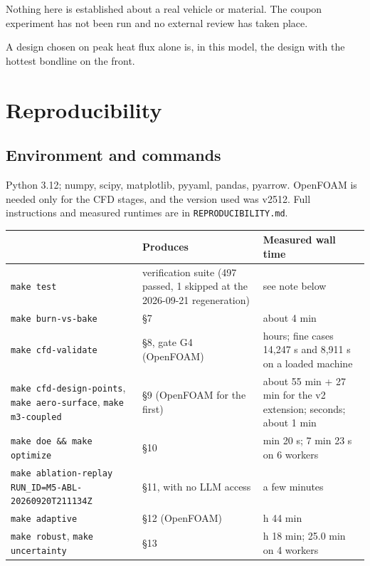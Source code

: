 \documentclass[
  a4paper,
  11pt]{article}
\newcommand{\tabhead}[1]{{\sffamily\bfseries\fontsize{8.5}{10.5}\selectfont #1}}
\begin{document}
Nothing here is established about a real vehicle or material. The coupon
experiment has not been run and no external review has taken place.

A design chosen on peak heat flux alone is, in this model, the design
with the hottest bondline on the front.

\section{Reproducibility}

\subsection{Environment and commands}

Python 3.12; numpy, scipy, matplotlib, pyyaml, pandas, pyarrow. OpenFOAM
is needed only for the CFD stages, and the version used was v2512. Full
instructions and measured runtimes are in \texttt{REPRODUCIBILITY.md}.

\begin{center}
\small\centering
\begin{tabular}{@{}>{\raggedright\arraybackslash}p{}>{\raggedright\arraybackslash}p{}>{\raggedright\arraybackslash}p{}@{}}
\toprule
\tabhead{Command} & \tabhead{Produces} & \tabhead{Measured wall time} \\
\midrule
\texttt{make test} & verification suite (497 passed, 1 skipped at the 2026-09-21
regeneration) & see note below \\
\texttt{make burn-\allowbreak{}vs-\allowbreak{}bake} & §7 & about 4 min \\
\texttt{make cfd-\allowbreak{}validate} & §8, gate G4 (OpenFOAM) & hours; fine cases 14,247 s and 8,911 s on a loaded machine \\
\texttt{make cfd-\allowbreak{}design-\allowbreak{}points},
\texttt{make aero-\allowbreak{}surface},
\texttt{make m3-\allowbreak{}coupled} & §9 (OpenFOAM for the first) & about 55 min + 27 min for the v2 extension; seconds; about 1 min \\
\texttt{make doe \&\& make optimize} & §10 & 3 min 20 s; 7 min 23 s on 6 workers \\
\texttt{make ablation-\allowbreak{}replay RUN\_\allowbreak{}ID=M5-\allowbreak{}ABL-\allowbreak{}20260920T211134Z} & §11, with no LLM access & a few minutes \\
\texttt{make adaptive} & §12 (OpenFOAM) & 3 h 44 min \\
\texttt{make robust}, \texttt{make uncertainty} & §13 & 2 h 18 min; 25.0 min on 4 workers \\
\bottomrule
\end{tabular}
\end{center}
\end{document}
